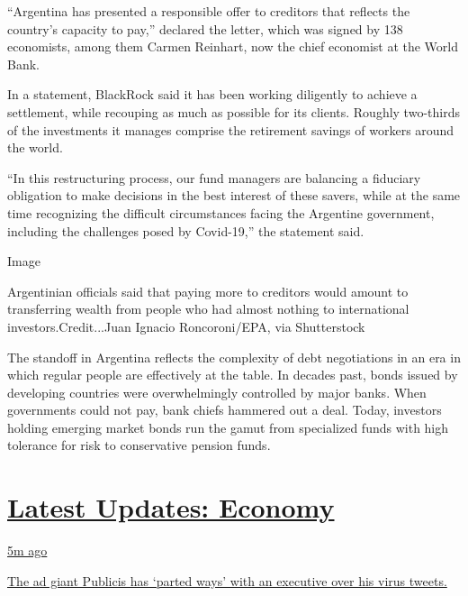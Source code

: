 ``Argentina has presented a responsible offer to creditors that reflects
the country's capacity to pay,'' declared the letter, which was signed
by 138 economists, among them Carmen Reinhart, now the chief economist
at the World Bank.

In a statement, BlackRock said it has been working diligently to achieve
a settlement, while recouping as much as possible for its clients.
Roughly two-thirds of the investments it manages comprise the retirement
savings of workers around the world.

``In this restructuring process, our fund managers are balancing a
fiduciary obligation to make decisions in the best interest of these
savers, while at the same time recognizing the difficult circumstances
facing the Argentine government, including the challenges posed by
Covid-19,'' the statement said.

Image

Argentinian officials said that paying more to creditors would amount to
transferring wealth from people who had almost nothing to international
investors.Credit...Juan Ignacio Roncoroni/EPA, via Shutterstock

The standoff in Argentina reflects the complexity of debt negotiations
in an era in which regular people are effectively at the table. In
decades past, bonds issued by developing countries were overwhelmingly
controlled by major banks. When governments could not pay, bank chiefs
hammered out a deal. Today, investors holding emerging market bonds run
the gamut from specialized funds with high tolerance for risk to
conservative pension funds.

\hypertarget{latest-updates-economy}{%
\section{\texorpdfstring{\href{https://www.nytimes.com/live/2020/08/04/business/stock-market-today-coronavirus?action=click\&pgtype=Article\&state=default\&region=MAIN_CONTENT_1\&context=storylines_live_updates}{Latest
Updates:
Economy}}{Latest Updates: Economy}}\label{latest-updates-economy}}

\href{https://www.nytimes.com/live/2020/08/04/business/stock-market-today-coronavirus?action=click\&pgtype=Article\&state=default\&region=MAIN_CONTENT_1\&context=storylines_live_updates\#the-ad-giant-publicis-has-parted-ways-with-an-executive-over-his-virus-tweets}{5m
ago}

\href{https://www.nytimes.com/live/2020/08/04/business/stock-market-today-coronavirus?action=click\&pgtype=Article\&state=default\&region=MAIN_CONTENT_1\&context=storylines_live_updates\#the-ad-giant-publicis-has-parted-ways-with-an-executive-over-his-virus-tweets}{The
ad giant Publicis has `parted ways' with an executive over his virus
tweets.}


